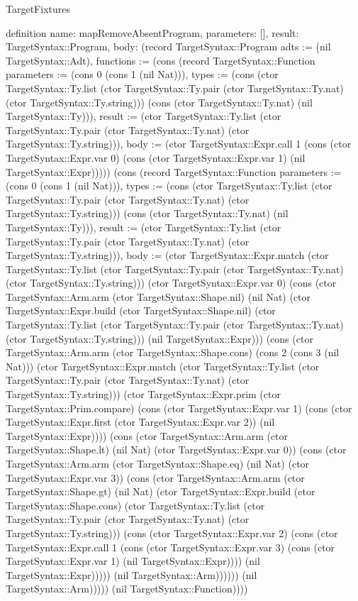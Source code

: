 \begin{lexlean}{TargetFixtures}
\begin{semanticmodule}
definition{
  name: mapRemoveAbsentProgram,
  parameters: [],
  result: TargetSyntax::Program,
  body: (record TargetSyntax::Program {adts := (nil TargetSyntax::Adt), functions := (cons (record TargetSyntax::Function {parameters := (cons 0 (cons 1 (nil Nat))), types := (cons (ctor TargetSyntax::Ty.list (ctor TargetSyntax::Ty.pair (ctor TargetSyntax::Ty.nat) (ctor TargetSyntax::Ty.string))) (cons (ctor TargetSyntax::Ty.nat) (nil TargetSyntax::Ty))), result := (ctor TargetSyntax::Ty.list (ctor TargetSyntax::Ty.pair (ctor TargetSyntax::Ty.nat) (ctor TargetSyntax::Ty.string))), body := (ctor TargetSyntax::Expr.call 1 (cons (ctor TargetSyntax::Expr.var 0) (cons (ctor TargetSyntax::Expr.var 1) (nil TargetSyntax::Expr))))}) (cons (record TargetSyntax::Function {parameters := (cons 0 (cons 1 (nil Nat))), types := (cons (ctor TargetSyntax::Ty.list (ctor TargetSyntax::Ty.pair (ctor TargetSyntax::Ty.nat) (ctor TargetSyntax::Ty.string))) (cons (ctor TargetSyntax::Ty.nat) (nil TargetSyntax::Ty))), result := (ctor TargetSyntax::Ty.list (ctor TargetSyntax::Ty.pair (ctor TargetSyntax::Ty.nat) (ctor TargetSyntax::Ty.string))), body := (ctor TargetSyntax::Expr.match (ctor TargetSyntax::Ty.list (ctor TargetSyntax::Ty.pair (ctor TargetSyntax::Ty.nat) (ctor TargetSyntax::Ty.string))) (ctor TargetSyntax::Expr.var 0) (cons (ctor TargetSyntax::Arm.arm (ctor TargetSyntax::Shape.nil) (nil Nat) (ctor TargetSyntax::Expr.build (ctor TargetSyntax::Shape.nil) (ctor TargetSyntax::Ty.list (ctor TargetSyntax::Ty.pair (ctor TargetSyntax::Ty.nat) (ctor TargetSyntax::Ty.string))) (nil TargetSyntax::Expr))) (cons (ctor TargetSyntax::Arm.arm (ctor TargetSyntax::Shape.cons) (cons 2 (cons 3 (nil Nat))) (ctor TargetSyntax::Expr.match (ctor TargetSyntax::Ty.list (ctor TargetSyntax::Ty.pair (ctor TargetSyntax::Ty.nat) (ctor TargetSyntax::Ty.string))) (ctor TargetSyntax::Expr.prim (ctor TargetSyntax::Prim.compare) (cons (ctor TargetSyntax::Expr.var 1) (cons (ctor TargetSyntax::Expr.first (ctor TargetSyntax::Expr.var 2)) (nil TargetSyntax::Expr)))) (cons (ctor TargetSyntax::Arm.arm (ctor TargetSyntax::Shape.lt) (nil Nat) (ctor TargetSyntax::Expr.var 0)) (cons (ctor TargetSyntax::Arm.arm (ctor TargetSyntax::Shape.eq) (nil Nat) (ctor TargetSyntax::Expr.var 3)) (cons (ctor TargetSyntax::Arm.arm (ctor TargetSyntax::Shape.gt) (nil Nat) (ctor TargetSyntax::Expr.build (ctor TargetSyntax::Shape.cons) (ctor TargetSyntax::Ty.list (ctor TargetSyntax::Ty.pair (ctor TargetSyntax::Ty.nat) (ctor TargetSyntax::Ty.string))) (cons (ctor TargetSyntax::Expr.var 2) (cons (ctor TargetSyntax::Expr.call 1 (cons (ctor TargetSyntax::Expr.var 3) (cons (ctor TargetSyntax::Expr.var 1) (nil TargetSyntax::Expr)))) (nil TargetSyntax::Expr))))) (nil TargetSyntax::Arm)))))) (nil TargetSyntax::Arm))))}) (nil TargetSyntax::Function)))})
}


\end{semanticmodule}
\end{lexlean}
